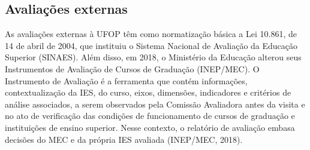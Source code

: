 \documentclass[
	12pt,				%
	openright,			%
	oneside,			%
	a4paper,			%
	english,			%
	brazil				%
	]{abntex2}
\begin{document}
\subsection*{Avaliações externas}
As avaliações externas à UFOP têm como normatização básica a Lei 10.861, de 14 de abril de 2004, que instituiu o Sistema Nacional de Avaliação da Educação Superior (SINAES). Além disso, em 2018, o Ministério da Educação alterou seus Instrumentos de Avaliação de Cursos de Graduação (INEP/MEC). O Instrumento de Avaliação é a ferramenta que contém informações, contextualização da IES, do curso, eixos, dimensões, indicadores e critérios de análise associados, a serem observados pela Comissão Avaliadora antes da visita e no ato de verificação das condições de funcionamento de cursos de graduação e instituições de ensino superior. Nesse contexto, o relatório de avaliação embasa decisões do MEC e da própria IES avaliada (INEP/MEC, 2018).

%
%
%
\postextual

\end{document}
